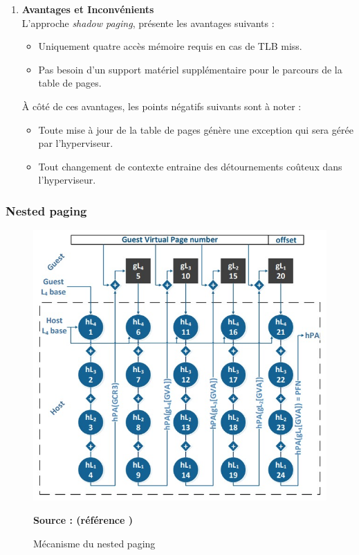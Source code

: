 \begin{enumerate}[label=\textbf{(\roman*)}]
    \item \textbf{Avantages et Inconvénients}\\
    L'approche \textit{shadow paging}, présente les avantages suivants :
    \begin{itemize}
        \item Uniquement quatre accès mémoire requis en cas de TLB miss.
        \item Pas besoin d'un support matériel supplémentaire pour le parcours de la table de pages.
    \end{itemize}
    
    À côté de ces avantages, les points négatifs suivants sont à noter :
    \begin{itemize}
        \item Toute mise à jour de la table de pages génère une exception qui sera gérée par l'hyperviseur.
        \item Tout changement de contexte entraine des détournements coûteux dans l'hyperviseur.
    \end{itemize}
\end{enumerate}

\subsubsection{Nested paging}
\label{subsubsection:nested_paging}

\begin{figure}[H]
        \centering
        \includegraphics[scale=.5]{chapters/1/fig1/nested_paging}
        \caption{Mécanisme du nested paging}
        \label{fig:parcours_2D}
        \centering \bfseries Source : (référence \cite{article8})
\end{figure}

